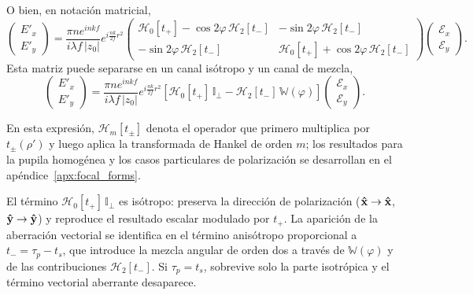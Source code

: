O bien, en notación matricial,
\begin{equation}
\boxed{
\begin{pmatrix}
E'_x\\
E'_y
\end{pmatrix}
=
\frac{\pi n e^{inkf}}{i\lambda f\,|z_0|}
e^{i\frac{nk}{2f}r^2}
\begin{pmatrix}
\mathscr H_0[t_+] - \cos2\varphi\,\mathscr H_2[t_-]
&
-\sin2\varphi\,\mathscr H_2[t_-]
\\
-\sin2\varphi\,\mathscr H_2[t_-]
&
\mathscr H_0[t_+] + \cos2\varphi\,\mathscr H_2[t_-]
\end{pmatrix}
\begin{pmatrix}
\mathscr E_x\\
\mathscr E_y
\end{pmatrix}.
}
\label{eq:Ex_Ey_Hankel_cartesian_matrix}
\end{equation}
Esta matriz puede separarse en un canal isótropo y un canal de mezcla,
\begin{equation}
\begin{pmatrix}
E'_x\\
E'_y
\end{pmatrix}
=
\frac{\pi n e^{inkf}}{i\lambda f\,|z_0|}
e^{i\frac{nk}{2f}r^2}
\left[
\mathscr H_0[t_+]\,\mathbb I_\perp
-
\mathscr H_2[t_-]\,\mathbb W(\varphi) \right]
\begin{pmatrix}
\mathscr E_x\\
\mathscr E_y
\end{pmatrix}.
\label{eq:Ex_Ey_Hankel_cartesian_matrix_separated}
\end{equation}

En esta expresión, $\mathscr H_m[t_\pm]$ denota el operador que primero
multiplica por $t_\pm(\rho')$ y luego aplica la transformada de Hankel de
orden $m$; los resultados para la pupila homogénea y los casos particulares de polarización se desarrollan en el apéndice~\ref{apx:focal_forms}.

El término $\mathscr{H}_0[t_+]\,\mathbb{I}_\perp$ es isótropo: preserva la dirección de polarización ($\bm{\hat{\mathbf{x}}}\to\bm{\hat{\mathbf{x}}}$, $\bm{\hat{\mathbf{y}}}\to\bm{\hat{\mathbf{y}}}$) y reproduce el resultado escalar modulado por $t_+$. La aparición de la aberración vectorial se identifica en el término anisótropo proporcional a $t_-=\tau_p-t_s$, que introduce la mezcla angular de orden dos a través de $\mathbb{W}(\varphi)$ y de las contribuciones $\mathscr{H}_2[t_-]$. Si $\tau_p=t_s$, sobrevive solo la parte isotrópica y el término vectorial aberrante desaparece.

